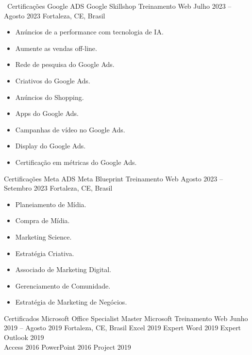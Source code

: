 
\cvevent
	{%
		\faGoogle\ Certificações Google ADS%
		\quad%
		\hrulefill%
		}
	{Google Skillshop \hfill \faEdge Treinamento Web}
	{Julho 2023 -- Agosto 2023}
	{Fortaleza, CE, Brasil}
\vspace{-0.5em} 
\begin{multicols}{2}
	\begin{itemize}[leftmargin=*,itemsep=0.5em,topsep=0.5em]
		\item Anúncios de a performance com tecnologia de IA.
		\item Aumente as vendas off-line.
		\item Rede de pesquisa do Google Ads.
		\item Criativos do Google Ads.
		\item Anúncios do Shopping.
		\item Apps do Google Ads.
		\item Campanhas	de vídeo no Google Ads.
		\item Display do Google Ads.
		\item Certificação em métricas do Google Ads.
	\end{itemize}
\end{multicols}

\cvevent
	{\faFacebook  Certificações Meta ADS%
		\quad%
		\hrulefill%
		}
	{Meta Blueprint \hfill \faEdge Treinamento Web}
	{Agosto 2023 -- Setembro 2023}
	{Fortaleza, CE, Brasil}
\vspace{-0.5em} 
\begin{multicols}{2}
	\begin{itemize}[leftmargin=*,itemsep=0.5em,topsep=0.5em]
		\item Planeiamento de Mídia.
		\item Compra de Mídia.
		\item Marketing Science.
		\item Estratégia Criativa.
		\item Associado de Marketing Digital.
		\item Gerenciamento de Comunidade.
		\item Estratégia de Marketing de Negócios.
	\end{itemize}
\end{multicols}

\cvevent
{\faMicrosoft Certificados Microsoft Office Specialist Master}
{Microsoft \hfill \faEdge Treinamento Web}
{Junho 2019 -- Agosto 2019}
{Fortaleza, CE, Brasil}
\cvtag
{\faFileExcel[regular] Excel 2019 Expert} 
\cvtag
{\faFileWord[regular] Word 2019 Expert} 
\cvtag
{Outlook 2019} \\ 
\cvtag
{\faDatabase Access 2016} 
\cvtag
{\faFilePowerpoint[regular] PowerPoint 2016}  
\cvtag
{Project 2019}